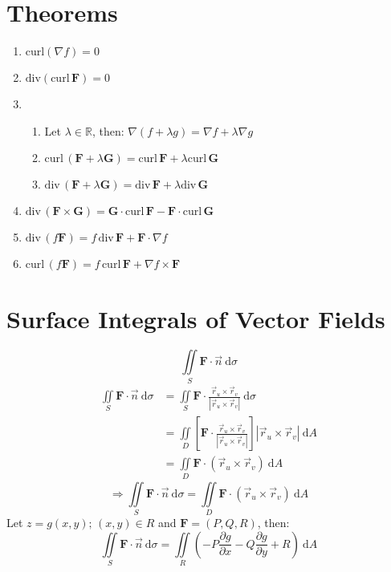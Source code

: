 \documentclass[12pt, fleqn]{book}
\newcommand{\D}{\mathrm{d}}
\newcommand{\iis}{\iint\limits_S}
\newcommand{\rutrv}{\vec{r}_u \times \vec{r}_v\right}
\newcommand{\F}{\mathbf{F}}
\newcommand{\G}{\mathbf{G}}
\newcommand{\Curl}{\mathrm{curl}}
\newcommand{\Div}{\mathrm{div}}
\newcommand{\xy}{(x, y)}
\newcommand{\rond}[2]{\frac{\partial #1}{\partial #2}}
\begin{document}
     	\section{Theorems}
     		\begin{enumerate}
     			\item $\Curl(\nabla f) = 0$
     			\item $\Div(\Curl \, \F) = 0$
                \item \begin{enumerate}
     					\item Let $\lambda \in \mathbb{R}$, then: $\nabla(f + \lambda g) = \nabla f + \lambda \nabla g$
		     			\item $\Curl \, (\F + \lambda \G) = \Curl \, \F + \lambda\Curl \, \G$
		     			\item $\Div \, (\F + \lambda \G) = \Div \, \F + \lambda\Div \, \G$
     			\end{enumerate}
     			\item $\Div \, (\F \times \G) = \G \cdot \Curl \, \F - \F \cdot \Curl \, \G$
     			\item $\Div \, (f \F) = f \, \Div \, \F + \F \cdot \nabla f$
     			\item $\Curl \, (f \F) = f \, \Curl \, \F + \nabla f \times \F$
     		\end{enumerate}
     	\section{Surface Integrals of Vector Fields}
     		\begin{equation}
     			\iis \F \cdot \vec{n} \ \D \sigma
     		\end{equation}
     		\begin{equation*}
     			\begin{split}
     				\iis \F \cdot \vec{n} \ \D \sigma
     				&  = \iis \F \cdot \frac{\vec{r}_u \times \vec{r}_v}{\left|\rutrv|} \ \D \sigma \\
     				& = \iint\limits_D \left[\F \cdot \frac{\vec{r}_u \times \vec{r}_v}{\left|\rutrv|}\right] \left|\rutrv| \ \D A \\
     				& = \iint\limits_D \F \cdot \left(\rutrv) \ \D A
     			\end{split}
     		\end{equation*}
     	    \begin{equation}
     	    	\Rightarrow 
     	    	\iis \F \cdot \vec{n} \ \D \sigma = \iint\limits_D \F \cdot \left(\rutrv) \ \D A
     	    \end{equation}
     		Let $z = g\xy; \, \xy \in R$ and $\F = (P, Q, R)$, then:
     		\begin{equation}
     			\iis \F \cdot \vec{n} \ \D \sigma = 
     			\iint\limits_R \left(-P \rond{g}{x} - Q\rond{g}{y} + R\right) \ \D A
     		\end{equation}
     	
\end{document}
